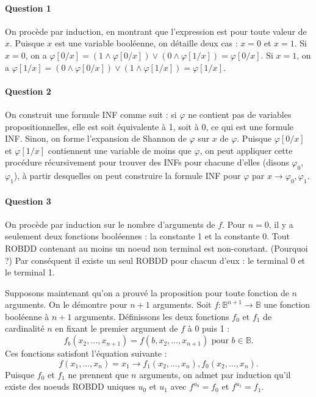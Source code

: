 \documentclass{article}
\begin{document}
\paragraph{Question 1}

On procède par induction, en montrant que l'expression est pour toute valeur de $x$. Puisque $x$ est une variable booléenne, on détaille deux cas : $x=0$ et $x=1$. Si $x=0$, on a $\varphi[0/x] = (1 \land \varphi[0/x]) \lor (0 \land \varphi[1/x]) = \varphi[0/x]$. Si $x=1$, on a $\varphi[1/x] = (0 \land \varphi[0/x]) \lor (1 \land \varphi[1/x]) = \varphi[1/x]$.

\paragraph{Question 2}

On construit une formule INF comme suit : si  $\varphi$ ne contient pas de variables propositionnelles, elle est soit équivalente à 1, soit à 0, ce qui est une formule INF. Sinon, on forme l'expansion de Shannon de $\varphi$ sur $x$ de $\varphi$. Puisque $\varphi[0/x]$ et $\varphi[1/x]$ contiennent une variable de moins que $\varphi$, on peut appliquer cette procédure récursivement pour trouver des INFs pour chacune d'elles (disons  $\varphi_0$, $\varphi_1$), à partir desquelles on peut construire la formule INF pour $\varphi$ par $x \rightarrow \varphi_0, \varphi_1$.

\paragraph{Question 3}

On procède par induction sur le nombre d'arguments de $f$. Pour $n=0$, il y a seulement deux fonctions booléennes : la constante 1 et la constante 0. Tout ROBDD contenant au moins un noeud non terminal est non-constant. (Pourquoi ?) Par conséquent il existe un seul ROBDD pour chacun d'eux : le terminal 0 et le terminal 1.

Supposons maintenant qu'on a prouvé la proposition pour toute fonction de $n$ arguments. On le démontre pour $n+1$ arguments. Soit $f \colon \mathbb{B}^{n+1} \to \mathbb{B}$ une fonction booléenne à $n+1$ arguments. Définissons les deux fonctions $f_0$ et $f_1$ de cardinalité $n$ en fixant le premier argument de $f$ à 0 puis 1 : \[ f_b(x_2, \dots, x_{n+1}) = f(b, x_2, \dots, x_{n+1})  \text{ pour }b\in\mathbb{B}. \] Ces fonctions satisfont l'équation suivante : \[ f(x_1, \dots, x_n) = x_1 \rightarrow f_1(x_2, \dots, x_n), f_0(x_2, \dots, x_n). \] Puisque $f_0$ et $f_1$ ne prennent que $n$ arguments, on admet par induction qu'il existe des noeuds ROBDD uniques $u_0$ et $u_1$ avec $f^{u_0} = f_0$ et $f^{u_1} = f_1$. 
\end{document}
